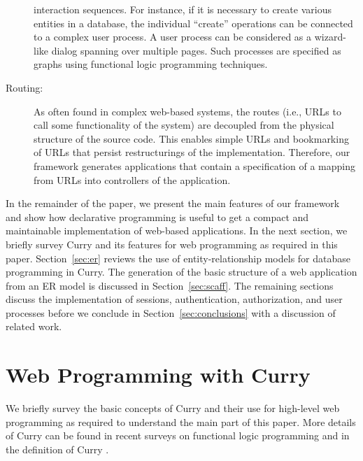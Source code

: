\documentclass{tlp}
\begin{document}
\begin{description}
interaction sequences. For instance, if it is necessary
to create various entities in a database, the individual ``create''
operations can be connected to a complex user process.
A user process can be considered as a wizard-like dialog
spanning over multiple pages.
Such processes are specified as graphs using functional logic
programming techniques.
\item[Routing:]
As often found in complex web-based systems,
the routes (i.e., URLs to call some functionality of the system)
are decoupled from the physical structure of the source code.
This enables simple URLs and bookmarking of URLs that persist restructurings
of the implementation.
Therefore, our framework generates applications that contain
a specification of a mapping from URLs into controllers of the application.
\end{description}
In the remainder of the paper, we present the main features of our framework
and show how declarative programming is useful to get a
compact and maintainable implementation of web-based applications.
In the next section, we briefly survey Curry and its features
for web programming as required in this paper.
Section~\ref{sec:er} reviews the use of entity-relationship models
for database programming in Curry.
The generation of the basic structure of a web application
from an ER model is discussed in Section~\ref{sec:scaff}.
The remaining sections discuss the implementation of sessions,
authentication, authorization, and user processes
before we conclude in
Section~\ref{sec:conclusions} with a discussion of related work.


\section{Web Programming with Curry}
\label{sec:curry}

We briefly survey the basic concepts of Curry and their use
for high-level web programming as required to understand the main
part of this paper.
More details of Curry can be found in recent surveys on
functional logic programming \cite{AntoyHanus10CACM,Hanus07ICLP}
and in the definition of Curry \cite{Hanus12Curry}.
\end{document}
